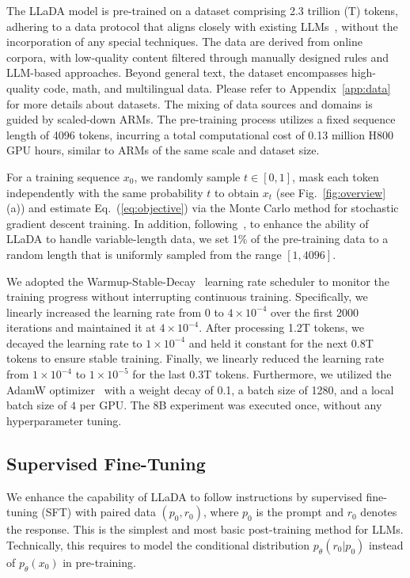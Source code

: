 \documentclass{article}
\begin{document}
The LLaDA model is pre-trained on a dataset comprising 2.3 trillion (T) tokens, adhering to a data protocol that aligns closely with existing LLMs~\citep{qwen2,qwen2.5}, without the incorporation of any special techniques. The data are derived from online corpora, with low-quality content filtered through manually designed rules and LLM-based approaches. Beyond general text, the dataset encompasses high-quality code, math, and multilingual data. Please refer to Appendix~\ref{app:data} for more details about datasets. The mixing of data sources and domains is guided by scaled-down ARMs. The pre-training process utilizes a fixed sequence length of 4096 tokens, incurring a total computational cost of 0.13 million H800 GPU hours, similar to ARMs of the same scale and dataset size.
 

For a training sequence $x_0$, we randomly sample $t\in[0,1]$, mask each token independently with the same probability $t$ to obtain $x_t$ (see Fig.~\ref{fig:overview} (a)) and estimate Eq.~(\ref{eq:objective}) via the Monte Carlo method for stochastic gradient descent training. In addition, following~\citet{nie2024scaling}, to enhance the ability of LLaDA to handle variable-length data, we set 1\% of the pre-training data to a random length that is uniformly sampled from the range $[1, 4096]$.


We adopted the Warmup-Stable-Decay~\citep{hu2024minicpm} learning rate scheduler to monitor the training progress without interrupting continuous training. Specifically, we linearly increased the learning rate from 0 to \( 4 \times 10^{-4} \) over the first 2000 iterations and maintained it at \( 4 \times 10^{-4} \). After processing 1.2T tokens, we decayed the learning rate to \( 1 \times 10^{-4} \) and held it constant for the next 0.8T tokens to ensure stable training. Finally, we linearly reduced the learning rate from \( 1 \times 10^{-4} \) to \( 1 \times 10^{-5} \) for the last 0.3T tokens. Furthermore, we utilized the AdamW optimizer~\citep{loshchilov2017decoupled} with a weight decay of 0.1, a batch size of 1280, and a local batch size of $4$ per GPU. The 8B experiment was executed once, without any hyperparameter tuning.


\subsection{Supervised Fine-Tuning} 

We enhance the capability of LLaDA to follow instructions by supervised fine-tuning (SFT) with paired data \((p_0, r_0)\), where \(p_0\) is the prompt and \(r_0\) denotes the response. This is the simplest and most basic post-training method for LLMs. Technically, this requires to model the conditional distribution \(p_{\theta}(r_0|p_0)\) instead of \(p_{\theta}(x_0)\) in pre-training.
\end{document}
